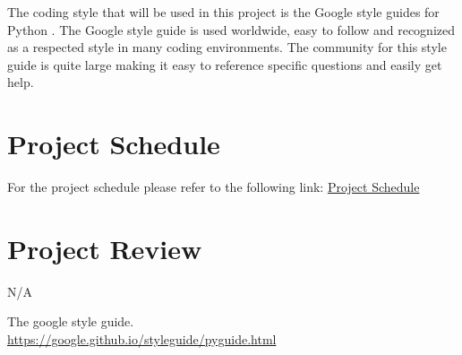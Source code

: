 \documentclass{article}
\begin{document}
The coding style that will be used in this project is the Google style guides for Python \cite{style}. The Google style guide is used worldwide, easy to follow and recognized as a respected style in many coding environments. The community for this style guide is quite large making it easy to reference specific questions and easily get help.

\section{Project Schedule}

For the project schedule please refer to the following link: 
\href{https://gitlab.cas.mcmaster.ca/balacs1/se3xa3-project/-/tree/master/ProjectSchedule}{Project Schedule}

\section{Project Review}
N/A

\begin{thebibliography}{9}
	The google style guide.\\
	\url{https://google.github.io/styleguide/pyguide.html}
\end{thebibliography}
\end{document}
